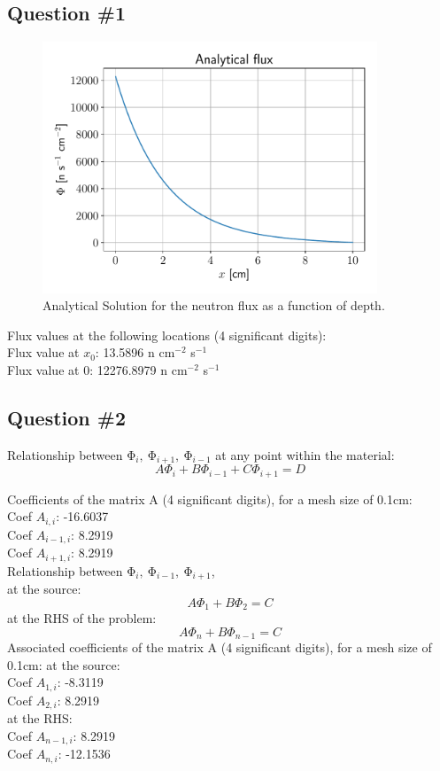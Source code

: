 \documentclass[11pt,a4paper]{article}
\begin{document}
\subsection{Question \#1}
\begin{figure}[h]
\includegraphics[width=10cm]{fig/Ex1_Analytical.pdf}
\centering
\caption{Analytical Solution for the neutron flux as a function of depth.}
\end{figure}
Flux values at the following locations (4 significant digits):\\
Flux value at $x_0$: 13.5896 n cm$^{-2}$ s$^{-1}$ \\
Flux value at $0$: 12276.8979 n cm$^{-2}$ s$^{-1}$ \\

\subsection{Question \#2}

Relationship between $\mathrm{\Phi}_i,\ \mathrm{\Phi}_{i+1},\ \mathrm{\Phi}_{i-1}$ at any point within the material:
\begin{equation}
    A \Phi_i + B \Phi_{i-1} +C \Phi_{i+1} = D
\end{equation}

Coefficients of the matrix A (4 significant digits), for a mesh size of 0.1cm:\\
Coef $A_{i,i}$: -16.6037 \\
Coef $A_{i-1,i}$: 8.2919 \\
Coef $A_{i+1,i}$: 8.2919 \\

Relationship between $\mathrm{\Phi}_i,\ \mathrm{\Phi}_{i-1},\ \mathrm{\Phi}_{i+1}$, \\
at the source:
\begin{equation}
    A \Phi_1 + B \Phi_{2} = C
\end{equation}
at the RHS of the problem:
\begin{equation}
    A \Phi_n + B \Phi_{n-1} = C
\end{equation}
Associated coefficients of the matrix A (4 significant digits), for a mesh size of 0.1cm:
at the source: \\
Coef $A_{1,i}$: -8.3119 \\
Coef $A_{2,i}$: 8.2919 \\
at the RHS: \\
Coef $A_{n-1,i}$: 8.2919 \\
Coef $A_{n,i}$: -12.1536 \\
\end{document}

